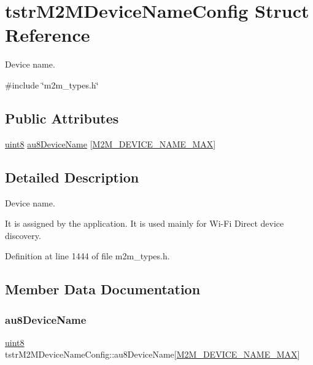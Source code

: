 \hypertarget{structtstrM2MDeviceNameConfig}{}\section{tstr\+M2\+M\+Device\+Name\+Config Struct Reference}
\label{structtstrM2MDeviceNameConfig}


Device name.  




{\ttfamily \#include \char`\"{}m2m\+\_\+types.\+h\char`\"{}}

\subsection*{Public Attributes}
\begin{DoxyCompactItemize}
\item 
\hyperlink{group__DataT_ga4df709a77647e870bbf1d955b8edc9a6}{uint8} \hyperlink{structtstrM2MDeviceNameConfig_a0b580031f6f989a230cc78f0cb6fb2ce}{au8\+Device\+Name} \mbox{[}\hyperlink{group__WlanDefines_ga13694b7fb6c7afefab58c38a43aa1957}{M2\+M\+\_\+\+D\+E\+V\+I\+C\+E\+\_\+\+N\+A\+M\+E\+\_\+\+M\+AX}\mbox{]}
\end{DoxyCompactItemize}


\subsection{Detailed Description}
Device name. 

It is assigned by the application. It is used mainly for Wi-\/\+Fi Direct device discovery. 

Definition at line 1444 of file m2m\+\_\+types.\+h.



\subsection{Member Data Documentation}
\mbox{\label{structtstrM2MDeviceNameConfig_a0b580031f6f989a230cc78f0cb6fb2ce}} 
\subsubsection{\texorpdfstring{au8\+Device\+Name}{au8DeviceName}}
{\footnotesize\ttfamily \hyperlink{group__DataT_ga4df709a77647e870bbf1d955b8edc9a6}{uint8} tstr\+M2\+M\+Device\+Name\+Config\+::au8\+Device\+Name\mbox{[}\hyperlink{group__WlanDefines_ga13694b7fb6c7afefab58c38a43aa1957}{M2\+M\+\_\+\+D\+E\+V\+I\+C\+E\+\_\+\+N\+A\+M\+E\+\_\+\+M\+AX}\mbox{]}}

